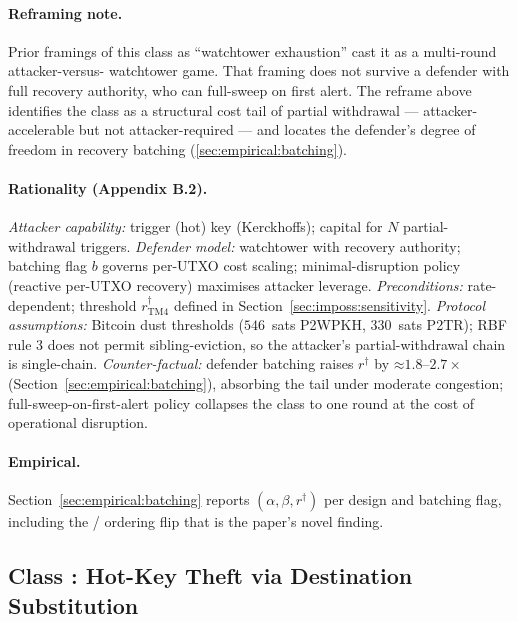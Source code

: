 \paragraph{Reframing note.} Prior framings of this class as
``watchtower exhaustion'' cast it as a multi-round attacker-versus-
watchtower game. That framing does not survive a defender with full
recovery authority, who can full-sweep on first alert. The reframe
above identifies the class as a structural cost tail of partial
withdrawal --- attacker-accelerable but not attacker-required --- and
locates the defender's degree of freedom in recovery batching
(\ref{sec:empirical:batching}).

\paragraph{Rationality (Appendix B.2).} \emph{Attacker capability:}
trigger (hot) key (Kerckhoffs); capital for $N$ partial-withdrawal
triggers. \emph{Defender model:} watchtower with recovery authority;
batching flag $b$ governs per-UTXO cost scaling; minimal-disruption
policy (reactive per-UTXO recovery) maximises attacker leverage.
\emph{Preconditions:} rate-dependent; threshold
$r^\dagger_{\mathrm{TM4}}$ defined in
Section~\ref{sec:imposs:sensitivity}. \emph{Protocol assumptions:}
Bitcoin dust thresholds ($546$~sats P2WPKH, $330$~sats P2TR); RBF
rule 3 does not permit sibling-eviction, so the attacker's
partial-withdrawal chain is single-chain.
\emph{Counter-factual:} defender batching raises $r^\dagger$ by
$\mathord{\approx}\!1.8$--$2.7\times$
(Section~\ref{sec:empirical:batching}), absorbing the tail under
moderate congestion; full-sweep-on-first-alert policy collapses the
class to one round at the cost of operational disruption.

\paragraph{Empirical.} Section~\ref{sec:empirical:batching} reports
$(\alpha, \beta, r^\dagger)$ per design and batching flag, including
the \opccv{}/\opvault{} ordering flip that is the paper's novel
finding.

\subsection{Class \classhot{}: Hot-Key Theft via Destination Substitution}
\label{sec:imposs:class_hot}

